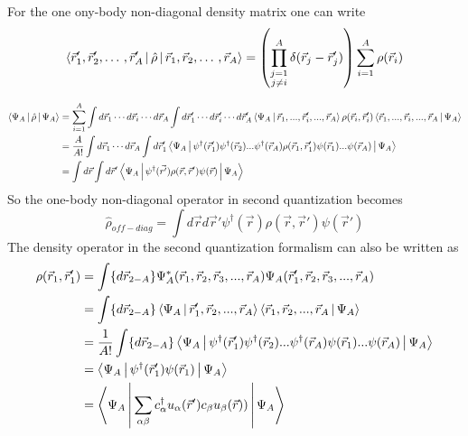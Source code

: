 \documentclass[12pt]{article}
\begin{document}
For the one ony-body non-diagonal density matrix one can write
\begin{align}
\Braket{\vec{r}'_1, \vec{r}'_2, \dotso, \vec{r}'_A|\hat{\rho}|\vec{r}_1, \vec{r}_2, \dotso, \vec{r}_A} = \left( \prod_{\substack{j=1 \\ j \neq i }}^{A} \delta(\vec{r}_j-\vec{r}_j') \right) \sum_{i=1}^{A} \rho(\vec{r}_i)
\end{align}

\begin{align}
\Braket{\Psi_A|\hat{\rho}|\Psi_A} & =\sum_{i=1}^{A} \int d\vec{r}_1 \cdots d\vec{r}_i \cdots d\vec{r}_A \int d\vec{r}'_1 \cdots d\vec{r}'_i \cdots d\vec{r}'_A \Braket{\Psi_A|\vec{r}_1,..., \vec{r}'_i, ..., \vec{r}_A}  \rho(\vec{r}_i, \vec{r}'_i)\Braket{\vec{r}_1,..., \vec{r}_i, ..., \vec{r}_A|\Psi_A} \\
& = \frac{A}{A!} \int d\vec{r}_1 \cdots d\vec{r}_A \int d\vec{r}'_1 \Braket{\Psi_A|\psi^\dagger(\vec{r}'_1) \psi^\dagger(\vec{r}_2) ...\psi^\dagger(\vec{r}_A) \rho(\vec{r}_1,\vec{r}'_1) \psi(\vec{r}_1) ... \psi(\vec{r}_A)|\Psi_A } \\
& = \int d\vec{r} \int d\vec{r}' \Braket{\Psi_A|\psi^\dagger(\vec{r'}) \rho(\vec{r}, \vec{r}') \psi(\vec{r})|\Psi_A } 
\end{align}
So the one-body non-diagonal operator in second quantization becomes
\begin{equation}
\hat{\rho}_{off-diag} = \int d\vec{r} d \vec{r}' \psi^\dagger(\vec{r}) \rho(\vec{r}, \vec{r}') \psi(\vec{r}') 
\end{equation}
The density operator in the second quantization formalism can also be written as
\begin{align}
\rho(\vec{r}_1,\vec{r}'_1) & =  \int \{d\vec{r}_{2-A}\} \Psi^*_A(\vec{r}_1,\vec{r}_2,\vec{r}_3, ...,\vec{r}_A)\Psi_A(\vec{r}_1',\vec{r}_2,\vec{r}_3, ... ,\vec{r}_A) \\
& = \int \{d\vec{r}_{2-A}\} \Braket{\Psi_A|\vec{r}'_1,\vec{r}_2, ...,\vec{r}_A} \Braket{\vec{r}_1,\vec{r}_2, ...,\vec{r}_A |\Psi_A} \\
& = \frac{1}{A!} \int \{d\vec{r}_{2-A}\} \Braket{\Psi_A|\psi^\dagger(\vec{r}'_1) \psi^\dagger(\vec{r}_2) ...\psi^\dagger(\vec{r}_A) \psi(\vec{r}_1) ... \psi(\vec{r}_A)|\Psi_A } \\
& = \Braket{\Psi_A|\psi^\dagger(\vec{r}'_1) \psi(\vec{r}_1)|\Psi_A } \\
& = \Braket{\Psi_A|\sum_{\alpha \beta} c^\dagger_{\alpha} u_\alpha(\vec{r}')c_{\beta} u_\beta(\vec{r})) |\Psi_A }
\end{align}
\end{document}
